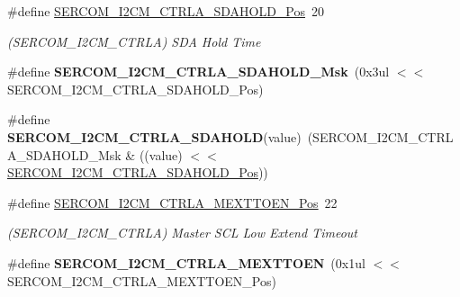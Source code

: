 \begin{DoxyCompactItemize}
\item 
\hypertarget{group___s_a_m_l21___s_e_r_c_o_m_ga00c1a039c1197e35736d6a42fedb84e2}{}\#define \hyperlink{group___s_a_m_l21___s_e_r_c_o_m_ga00c1a039c1197e35736d6a42fedb84e2}{S\+E\+R\+C\+O\+M\+\_\+\+I2\+C\+M\+\_\+\+C\+T\+R\+L\+A\+\_\+\+S\+D\+A\+H\+O\+L\+D\+\_\+\+Pos}~20\label{group___s_a_m_l21___s_e_r_c_o_m_ga00c1a039c1197e35736d6a42fedb84e2}

\begin{DoxyCompactList}\small\item\em (S\+E\+R\+C\+O\+M\+\_\+\+I2\+C\+M\+\_\+\+C\+T\+R\+L\+A) S\+D\+A Hold Time \end{DoxyCompactList}\item 
\hypertarget{group___s_a_m_l21___s_e_r_c_o_m_gad92c7795b00bb0786acb6eff4051523b}{}\#define {\bfseries S\+E\+R\+C\+O\+M\+\_\+\+I2\+C\+M\+\_\+\+C\+T\+R\+L\+A\+\_\+\+S\+D\+A\+H\+O\+L\+D\+\_\+\+Msk}~(0x3ul $<$$<$ S\+E\+R\+C\+O\+M\+\_\+\+I2\+C\+M\+\_\+\+C\+T\+R\+L\+A\+\_\+\+S\+D\+A\+H\+O\+L\+D\+\_\+\+Pos)\label{group___s_a_m_l21___s_e_r_c_o_m_gad92c7795b00bb0786acb6eff4051523b}

\item 
\hypertarget{group___s_a_m_l21___s_e_r_c_o_m_gae5dc19b0052b42700c75e7d17177515a}{}\#define {\bfseries S\+E\+R\+C\+O\+M\+\_\+\+I2\+C\+M\+\_\+\+C\+T\+R\+L\+A\+\_\+\+S\+D\+A\+H\+O\+L\+D}(value)~(S\+E\+R\+C\+O\+M\+\_\+\+I2\+C\+M\+\_\+\+C\+T\+R\+L\+A\+\_\+\+S\+D\+A\+H\+O\+L\+D\+\_\+\+Msk \& ((value) $<$$<$ \hyperlink{group___s_a_m_l21___s_e_r_c_o_m_ga00c1a039c1197e35736d6a42fedb84e2}{S\+E\+R\+C\+O\+M\+\_\+\+I2\+C\+M\+\_\+\+C\+T\+R\+L\+A\+\_\+\+S\+D\+A\+H\+O\+L\+D\+\_\+\+Pos}))\label{group___s_a_m_l21___s_e_r_c_o_m_gae5dc19b0052b42700c75e7d17177515a}

\item 
\hypertarget{group___s_a_m_l21___s_e_r_c_o_m_ga9340ed3c3ec98ea56c0402ea05ec05a4}{}\#define \hyperlink{group___s_a_m_l21___s_e_r_c_o_m_ga9340ed3c3ec98ea56c0402ea05ec05a4}{S\+E\+R\+C\+O\+M\+\_\+\+I2\+C\+M\+\_\+\+C\+T\+R\+L\+A\+\_\+\+M\+E\+X\+T\+T\+O\+E\+N\+\_\+\+Pos}~22\label{group___s_a_m_l21___s_e_r_c_o_m_ga9340ed3c3ec98ea56c0402ea05ec05a4}

\begin{DoxyCompactList}\small\item\em (S\+E\+R\+C\+O\+M\+\_\+\+I2\+C\+M\+\_\+\+C\+T\+R\+L\+A) Master S\+C\+L Low Extend Timeout \end{DoxyCompactList}\item 
\hypertarget{group___s_a_m_l21___s_e_r_c_o_m_gae3806db578a2e66a22b6776b8d93a683}{}\#define {\bfseries S\+E\+R\+C\+O\+M\+\_\+\+I2\+C\+M\+\_\+\+C\+T\+R\+L\+A\+\_\+\+M\+E\+X\+T\+T\+O\+E\+N}~(0x1ul $<$$<$ S\+E\+R\+C\+O\+M\+\_\+\+I2\+C\+M\+\_\+\+C\+T\+R\+L\+A\+\_\+\+M\+E\+X\+T\+T\+O\+E\+N\+\_\+\+Pos)\label{group___s_a_m_l21___s_e_r_c_o_m_gae3806db578a2e66a22b6776b8d93a683}


\end{DoxyCompactItemize}

